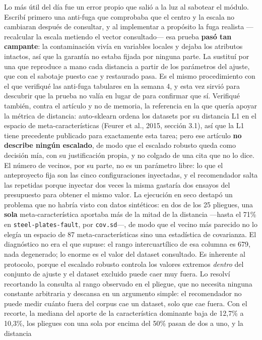 \documentclass[11pt,letterpaper]{article}
\begin{document}
{Lo más útil del día fue un error propio que salió a la luz al sabotear el módulo. Escribí
 primero una anti-fuga que comprobaba que el centro y la escala no cambiaran después de
 consultar, y al implementar a propósito la fuga realista —recalcular la escala metiendo el
 vector consultado— esa prueba \textbf{pasó tan campante}: la contaminación vivía en
 variables locales y dejaba los atributos intactos, así que la garantía no estaba fijada por
 ninguna parte. La sustituí por una que reproduce a mano cada distancia a partir de los
 parámetros del ajuste, que con el sabotaje puesto cae y restaurado pasa. Es el mismo
 procedimiento con el que verifiqué las anti-fuga tabulares en la semana 4, y esta vez
 sirvió para descubrir que la prueba no valía en lugar de para confirmar que sí. Verifiqué
 también, contra el artículo y no de memoria, la referencia en la que quería apoyar la
 métrica de distancia: auto-sklearn ordena los datasets por su distancia L1 en el espacio de
 meta-características (Feurer et al., 2015, sección 3.1), así que la L1 tiene precedente
 publicado para exactamente esta tarea; pero ese artículo \textbf{no describe ningún
 escalado}, de modo que el escalado robusto queda como decisión mía, con su justificación
 propia, y no colgado de una cita que no lo dice. El número de vecinos, por su parte, no es
 un parámetro libre: lo que el anteproyecto fija son las cinco configuraciones inyectadas, y
 el recomendador salta las repetidas porque inyectar dos veces la misma gastaría dos ensayos
 del presupuesto para obtener el mismo valor. La ejecución en seco destapó un problema que
 no habría visto con datos sintéticos: en dos de los 25 pliegues, una \textbf{sola}
 meta-característica aportaba más de la mitad de la distancia —hasta el 71\% en
 \texttt{steel-plates-fault}, por \texttt{cov.sd}—, de modo que el vecino más parecido no lo
 elegía un espacio de 87 meta-características sino una estadística de covarianza. El
 diagnóstico no era el que supuse: el rango intercuartílico de esa columna es 679, nada
 degenerado; lo enorme es el valor del dataset consultado. Es inherente al protocolo, porque
 el escalado robusto controla los valores extremos \emph{dentro} del conjunto de ajuste y el
 dataset excluido puede caer muy fuera. Lo resolví recortando la consulta al rango observado
 en el pliegue, que no necesita ninguna constante arbitraria y descansa en un argumento
 simple: el recomendador no puede medir cuánto fuera del corpus cae un dataset, solo que cae
 fuera. Con el recorte, la mediana del aporte de la característica dominante baja de 12,7\% a
 10,3\%, los pliegues con una sola por encima del 50\% pasan de dos a uno, y la distancia
}
\end{document}
